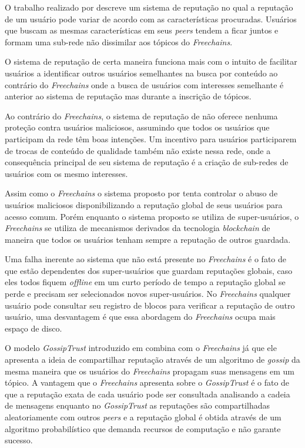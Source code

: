 \documentclass[12pt]{article}
\newcommand{\FC} {\emph{Freechains}\xspace}
\begin{document}
O trabalho realizado por \cite{1231515} descreve um sistema de reputação no qual a reputação de um usuário pode variar de acordo com as características procuradas. Usuários que buscam as mesmas características em seus \emph{peers} tendem a ficar juntos e formam uma sub-rede não dissimilar aos tópicos do \FC. 

O sistema de reputação de certa maneira funciona mais com o intuito de facilitar usuários a identificar outros usuários semelhantes na busca por conteúdo ao contrário do \FC onde a busca de usuários com interesses semelhante é anterior ao sistema de reputação mas durante a inscrição de tópicos.

Ao contrário do \FC, o sistema de reputação de \cite{1231515} não oferece nenhuma proteção contra usuários maliciosos, assumindo que todos os usuários que participam da rede têm boas intenções. Um incentivo para usuários participarem de trocas de conteúdo de qualidade também não existe nessa rede, onde a consequência principal de seu sistema de reputação é a criação de sub-redes de usuários com os mesmo interesses.

Assim como o \FC o sistema proposto por \cite{zhou2007powertrust} tenta controlar o abuso de usuários maliciosos disponibilizando a reputação global de seus usuários para acesso comum. Porém enquanto o sistema proposto se utiliza de super-usuários, o \FC se utiliza de mecanismos derivados da tecnologia \emph{blockchain} de maneira que todos os usuários tenham sempre a reputação de outros guardada. 

Uma falha inerente ao sistema que não está presente no \FC é o fato de que estão dependentes dos super-usuários que guardam reputações globais, caso eles todos fiquem \emph{offline} em um curto período de tempo a reputação global se perde e precisam ser selecionados novos super-usuários. No \FC qualquer usuário pode consultar seu registro de blocos para verificar a reputação de outro usuário, uma desvantagem é que essa abordagem do \FC ocupa mais espaço de disco.

O modelo \emph{GossipTrust} introduzido em \cite{zhou2007gossip} combina com o \FC já que ele apresenta a ideia de compartilhar reputação através de um algoritmo de \emph{gossip} da mesma maneira que os usuários do \FC propagam suas mensagens em um tópico. A vantagem que o \FC apresenta sobre o \emph{GossipTrust} é o fato de que a reputação exata de cada usuário pode ser consultada analisando a cadeia de mensagens enquanto no \emph{GossipTrust} as reputações são compartilhadas aleatoriamente com outros \emph{peers} e a reputação global é obtida através de um algoritmo probabilístico que demanda recursos de computação e não garante sucesso. 
\end{document}
